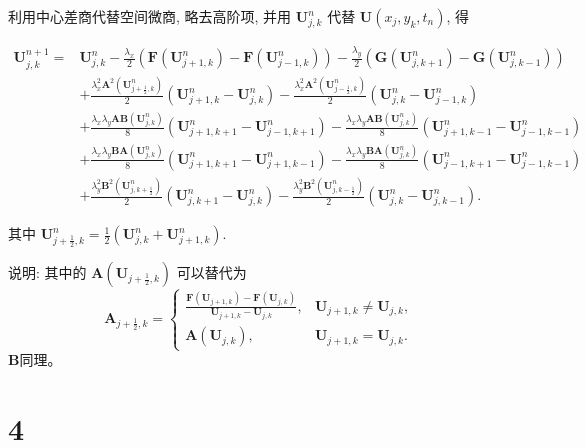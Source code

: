 \documentclass[12pt]{article}
\begin{document}
利用中心差商代替空间微商, 略去高阶项, 并用 $\bm{U}_{j,k}^{n}$ 代替 $\bm{U}\left(x_{j}, y_k, t_{n}\right)$, 得

\begin{align}
\bm{U}_{j,k}^{n+1}=& \bm{U}_{j,k}^{n}-\frac{\lambda_x}{2}\left(\bm{F}\left(\bm{U}_{j+1,k}^{n}\right)-\bm{F}\left(\bm{U}_{j-1,k}^{n}\right)\right)-\frac{\lambda_y}{2}\left(\bm{G}\left(\bm{U}_{j,k+1}^{n}\right)-\bm{G}\left(\bm{U}_{j,k-1}^{n}\right)\right) \\
&+\frac{\lambda_x^{2} \bm{A}^{2}\left(\bm{U}_{j+\frac{1}{2},k}^{n}\right)}{2}\left(\bm{U}_{j+1,k}^{n}-\bm{U}_{j,k}^{n}\right)-\frac{\lambda_x^{2} \bm{A}^{2}\left(\bm{U}_{j-\frac{1}{2},k}^{n}\right)}{2}\left(\bm{U}_{j,k}^{n}-\bm{U}_{j-1,k}^{n}\right)\\
&+\frac{\lambda_x\lambda_y \bm{A}\bm{B}\left(\bm{U}_{j,k}^{n}\right)}{8}\left(\bm{U}_{j+1,k+1}^{n}-\bm{U}_{j-1,k+1}^{n}\right)-\frac{\lambda_x\lambda_y \bm{A}\bm{B}\left(\bm{U}_{j,k}^{n}\right)}{8}\left(\bm{U}_{j+1,k-1}^{n}-\bm{U}_{j-1,k-1}^{n}\right)\\
&+\frac{\lambda_x\lambda_y \bm{B}\bm{A}\left(\bm{U}_{j,k}^{n}\right)}{8}\left(\bm{U}_{j+1,k+1}^{n}-\bm{U}_{j+1,k-1}^{n}\right)-\frac{\lambda_x\lambda_y \bm{B}\bm{A}\left(\bm{U}_{j,k}^{n}\right)}{8}\left(\bm{U}_{j-1,k+1}^{n}-\bm{U}_{j-1,k-1}^{n}\right)\\
&+\frac{\lambda_y^{2} \bm{B}^{2}\left(\bm{U}_{j,k+\frac{1}{2}}^{n}\right)}{2}\left(\bm{U}_{j,k+1}^{n}-\bm{U}_{j,k}^{n}\right)-\frac{\lambda_y^{2} \bm{B}^{2}\left(\bm{U}_{j,k-\frac{1}{2}}^{n}\right)}{2}\left(\bm{U}_{j,k}^{n}-\bm{U}_{j,k-1}^{n}\right).
\end{align}

其中 $\bm{U}_{j+\frac{1}{2},k}^{n}=\frac{1}{2}\left(\bm{U}_{j,k}^{n}+\bm{U}_{j+1,k}^{n}\right)$.

说明: 其中的 $\bm{A}\left(\bm{U}_{j+\frac{1}{2},k}\right)$ 可以替代为
\begin{equation}
	\bm{A}_{j+\frac{1}{2},k}=\left\{
		\begin{array}{ll}
		\frac{\bm{F}\left(\bm{U}_{j+1,k}\right)-\bm{F}\left(\bm{U}_{j,k}\right)}{\bm{U}_{j+1,k}-\bm{U}_{j,k}}, & \bm{U}_{j+1,k} \neq \bm{U}_{j,k}, \\
		\bm{A}\left(\bm{U}_{j,k}\right), & \bm{U}_{j+1,k}=\bm{U}_{j,k}.
		\end{array}\right.
\end{equation}
$\bm{B}$同理。


\section{4}
\end{document}
